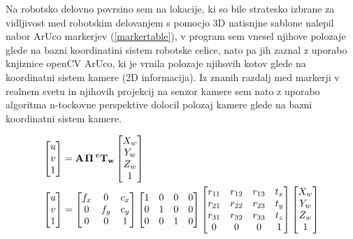 \documentclass[a4paper,twoside,openright,12pt,slovene]{book}
\begin{document}
Na robotsko delovno povrsino sem na lokacije, ki so bile stratesko izbrane za vidljivost med robotskim delovanjem s pomocjo 3D natisnjne sablone nalepil nabor ArUco markerjev (\ref{markertable}), v program sem vnesel njihove polozaje glede na bazni koordinatini sistem robotske celice, nato pa jih zaznal z uporabo knjiznice openCV ArUco, ki je vrnila polozaje njihovih kotov glede na koordinatni sistem kamere (2D informacija). Iz znanih razdalj med markerji v realnem svetu in njihovih projekcij na senzor kamere sem nato z uporabo algoritma n-tockovne perspektive dolocil polozaj kamere glede na bazni koordinatni sistem kamere.

\begin{align} \begin{bmatrix} u \\ v \\ 1 \end{bmatrix} &= \bf{A} \hspace{0.1em} \Pi \hspace{0.2em} ^{c}\bf{T}_w \begin{bmatrix} X_{w} \\ Y_{w} \\ Z_{w} \\ 1 \end{bmatrix} \\ \begin{bmatrix} u \\ v \\ 1 \end{bmatrix} &= \begin{bmatrix} f_x & 0 & c_x \\ 0 & f_y & c_y \\ 0 & 0 & 1 \end{bmatrix} \begin{bmatrix} 1 & 0 & 0 & 0 \\ 0 & 1 & 0 & 0 \\ 0 & 0 & 1 & 0 \end{bmatrix} \begin{bmatrix} r_{11} & r_{12} & r_{13} & t_x \\ r_{21} & r_{22} & r_{23} & t_y \\ r_{31} & r_{32} & r_{33} & t_z \\ 0 & 0 & 0 & 1 \end{bmatrix} \begin{bmatrix}\label{PNP} X_{w} \\ Y_{w} \\ Z_{w} \\ 1 \end{bmatrix} \end{align}
\end{document}
